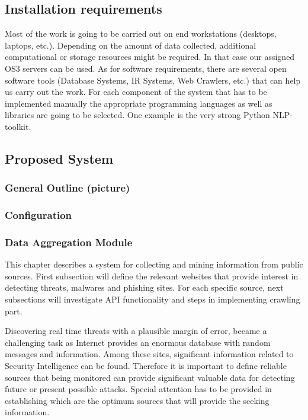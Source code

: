 \documentclass[12pt]{article}
\newcounter{subsubsubsection}[subsubsection]
\begin{document}
\subsection{Installation requirements}
\parbox{\linewidth}{
Most of the work is going to be carried out on end workstations (desktops, laptops, etc.). Depending on the amount of data collected, additional computational or storage resources might be required. In that case our assigned OS3 servers can be used. As for software requirements, there are several open software tools (Database Systems, IR Systems, Web Crawlers, etc.) that can help us carry out the work. For each component of the system that has to be implemented manually the appropriate programming languages as well as libraries are going to be selected. One example is the very strong Python NLP-toolkit.\cite{nltk} }
\subsection{Proposed System}
 
\subsubsection{General Outline (picture)}
\subsubsection{Configuration}
\subsubsection{Data Aggregation Module}
This chapter describes a system for collecting and mining information from public sources. First subsection will define the relevant websites that provide interest in detecting threats, malwares and phishing sites. For each specific source, next subsections will investigate API functionality and steps in implementing crawling part.

Discovering real time threats with a plausible margin of error, became a challenging task as Internet provides an enormous database with random messages and information. Among these sites, significant information related to Security Intelligence can be found. Therefore it is important to define reliable sources that being monitored can provide significant valuable data for detecting future or present possible attacks. Special attention has to be provided in establishing which are the optimum sources that will provide the seeking information. 
\end{document}
